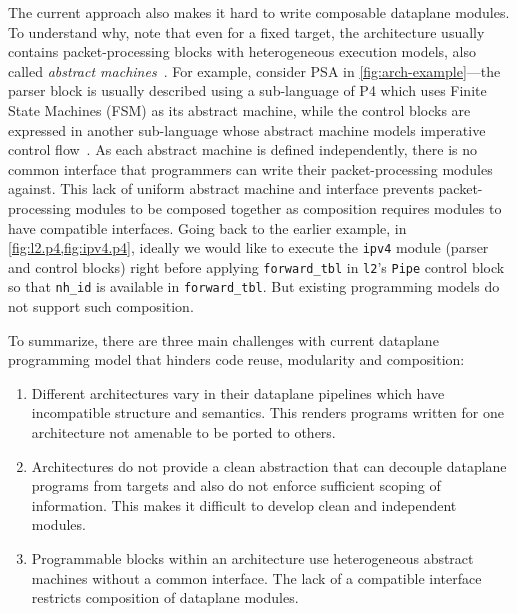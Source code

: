 \documentclass[letterpaper,twocolumn,10pt]{article}
\begin{document}
The current approach also makes it hard to write composable dataplane
modules. To understand why, note that even for a fixed target, the
architecture usually contains packet-processing blocks with
heterogeneous execution models, also called \emph{abstract
machines}~\cite{p4lang,van1991machine}. For example, consider PSA in
\cref{fig:arch-example}---the parser block  is usually described using
a sub-language of P4 which uses Finite State Machines (FSM) as its
abstract machine, while the control blocks are expressed in another
sub-language whose abstract machine models imperative control
flow~\cite{p4lang}. As each abstract machine is defined independently,
there is no common interface that programmers can write their
packet-processing modules against. This lack of uniform abstract
machine and interface prevents packet-processing modules to be
composed together as composition requires modules to have compatible
interfaces. Going back to the earlier example, in
\cref{fig:l2.p4,fig:ipv4.p4}, ideally we would like to execute the
\texttt{ipv4} module (parser and control blocks) right before applying
\texttt{forward\_tbl} in \texttt{l2}'s \texttt{Pipe} control block so
that \texttt{nh\_id} is available in \texttt{forward\_tbl}. But
existing programming models do not support such composition.

To summarize, there are three main challenges with current dataplane
programming model that hinders code reuse, modularity and composition:
\begin{enumerate}
  \item Different architectures vary in their dataplane pipelines
    which have incompatible structure and semantics. This renders
    programs written for one architecture not amenable to be ported to
    others.
  \item Architectures do not provide a clean abstraction that can
    decouple dataplane programs from targets and also do not enforce
    sufficient scoping of information. This makes it difficult to
    develop clean and independent modules.
  \item Programmable blocks within an architecture use heterogeneous
    abstract machines without a common interface. The lack of a
    compatible interface restricts composition of dataplane modules.
\end{enumerate}
\end{document}
